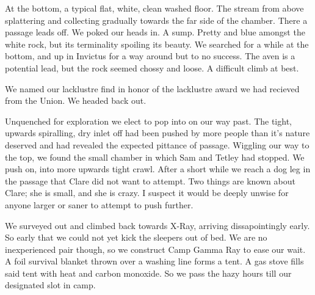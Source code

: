 At the bottom, a typical flat, white, clean washed floor. The stream from above splattering and collecting gradually towards the far side of the chamber. There a passage leads off. We poked our heads in. A sump. Pretty and blue amongst the white rock, but its terminality spoiling its beauty. We searched for a while at the bottom, and up in Invictus for a way around but to no success. The aven is a potential lead, but the rock seemed chossy and loose. A difficult climb at best.

We named our lacklustre find  in honor of the lacklustre award we had recieved from the Union. We headed back out. 

Unquenched for exploration we elect to pop into  on our way past. The tight, upwards spiralling, dry inlet off  had been pushed by more people than it's nature deserved and had revealed the expected pittance of passage. Wiggling our way to the top, we found the small chamber in which Sam and Tetley had stopped. We push on, into more upwards tight crawl. After a short while we reach a dog leg in the passage that Clare did not want to attempt. Two things are known about Clare; she is small, and she is crazy. I suspect it would be deeply unwise for anyone larger or saner to attempt to push further. 

We surveyed out and climbed back towards X-Ray, arriving dissapointingly early. So early that we could not yet kick the sleepers out of bed. We are no inexperienced pair though, so we construct Camp Gamma Ray to ease our wait. A foil survival blanket thrown over a washing line forms a tent. A gas stove fills said tent with heat and carbon monoxide. So we pass the hazy hours till our designated slot in camp.


